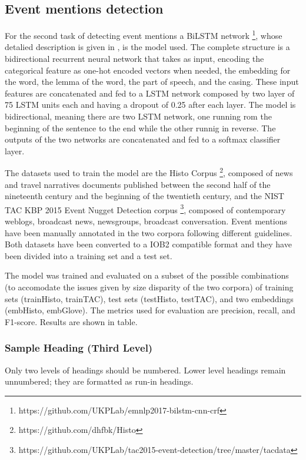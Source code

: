 \documentclass[runningheads]{llncs}
\begin{document}
\subsection{Event mentions detection}
For the second task of detecting event mentions a BiLSTM network \footnote{https://github.com/UKPLab/emnlp2017-bilstm-cnn-crf}, whose detalied description is given in \cite{bilstm}, is the model used. The complete structure is a bidirectional recurrent neural network that takes as input, encoding the categorical feature as one-hot encoded vectors when needed, the embedding for the word, the lemma of the word, the part of speech, and the casing. These input features are concatenated and fed to a LSTM network composed by two layer of 75 LSTM units each and having a dropout of 0.25 after each layer. The model is bidirectional, meaning there are two LSTM network, one running rom the beginning of the sentence to the end while the other runnig in reverse. The outputs of the two networks are concatenated and fed to a softmax classifier layer.

The datasets used to train the model are the Histo Corpus \cite{histo} \footnote{https://github.com/dhfbk/Histo}, composed of news and travel narratives documents published between the second half of the nineteenth century and the beginning of the twentieth century, and the NIST TAC KBP 2015 Event Nugget Detection corpus \cite{tac} \footnote{https://github.com/UKPLab/tac2015-event-detection/tree/master/tacdata}, composed of contemporary weblogs, broadcast news, newsgroups, broadcast conversation. Event mentions have been manually annotated in the two corpora following different guidelines. Both datasets have been converted to a IOB2 compatible format and they have been divided into a training set and a test set.

The model was trained and evaluated on a subset of the possible combinations (to accomodate the issues given by size disparity of the two corpora) of training sets (trainHisto, trainTAC), test sets (testHisto, testTAC), and two embeddings (embHisto, embGlove). The metrics used for evaluation are precision, recall, and F1-score. Results are shown in table. 



\subsubsection{Sample Heading (Third Level)} Only two levels of
headings should be numbered. Lower level headings remain unnumbered;
they are formatted as run-in headings.
\end{document}
